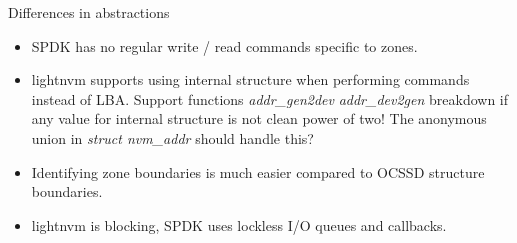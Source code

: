 \documentclass{beamer}
\begin{document}
\begin{frame}{Differences in abstractions}
	\begingroup
	\small
	\begin{itemize}
		\item SPDK has no regular write / read commands specific to
			  zones.
		\item lightnvm supports using internal structure when performing
			  commands instead of LBA. Support functions \textit{addr\_gen2dev}
			  \textit{addr\_dev2gen} breakdown if any value for internal
			  structure is not clean power of two! The anonymous union in
			  \textit{struct nvm\_addr} should handle this?
		\item Identifying zone boundaries is much easier compared to OCSSD
			  structure boundaries.
		\item lightnvm is blocking, SPDK uses lockless I/O queues and callbacks.
	\end{itemize}
	\endgroup
\end{frame}
\end{document}
